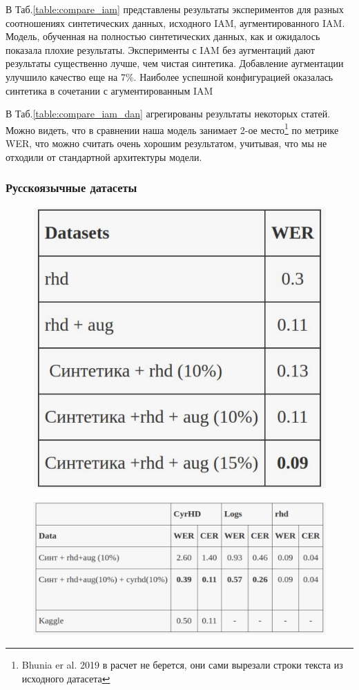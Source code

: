 \documentclass[12pt]{article}
\begin{document}
В Таб.\ref{table:compare_iam} представлены результаты экспериментов для разных соотношениях
синтетических данных, исходного IAM, аугментированного IAM.
Модель, обученная на полностью  синтетических данных, как и ожидалось показала плохие результаты.
Эксперименты с IAM без аугментаций дают результаты существенно 
лучше, чем чистая синтетика. Добавление аугментации улучшило качество еще на 7\%. 
Наиболее успешной конфигурацией оказалась синтетика  в сочетании с агументированным IAM

В Таб.\ref{table:compare_iam_dan} агрегированы результаты некоторых статей. Можно видеть, что в сравнении наша модель
занимает 2-ое место\footnote{Bhunia er al. 2019 в расчет не берется, они сами вырезали строки текста из исходного датасета} по метрике WER,
что можно считать очень хорошим результатом, учитывая, что мы не отходили от стандартной архитектуры модели.

\subsubsection{Русскоязычные датасеты}

\begin{figure}[htb]
    \centering
    \begin{minipage}{.45\textwidth}
        \centering
        \includegraphics[width=0.65\linewidth]{rhd_compare.png}
        \label{table:rhd_compare}
    \end{minipage}%
    \begin{minipage}{.55\textwidth}
        \centering
        \includegraphics[width=\linewidth]{russ_compare.png}
        \label{table:russ_compare}
    \end{minipage}
\end{figure}
\end{document}

